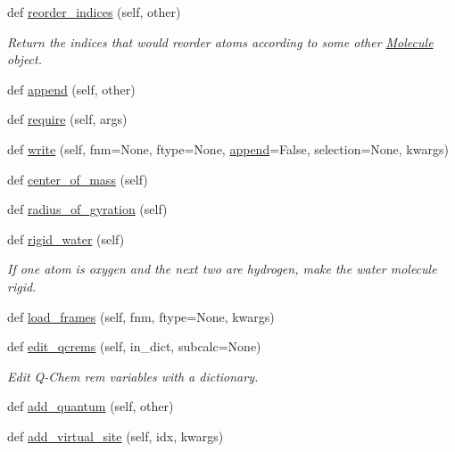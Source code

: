 \begin{DoxyCompactItemize}
def \hyperlink{classsrc_1_1molecule_1_1Molecule_a9f764980b8a0df810aa7264036617975}{reorder\+\_\+indices} (self, other)
\begin{DoxyCompactList}\small\item\em Return the indices that would reorder atoms according to some other \hyperlink{classsrc_1_1molecule_1_1Molecule}{Molecule} object. \end{DoxyCompactList}\item 
def \hyperlink{classsrc_1_1molecule_1_1Molecule_a1969b621b7e6e65722ec245b74518cfe}{append} (self, other)
\item 
def \hyperlink{classsrc_1_1molecule_1_1Molecule_a5e74901959a8b939fc5a6c851e64d4ae}{require} (self, args)
\item 
def \hyperlink{classsrc_1_1molecule_1_1Molecule_a557af72409188133ef446ee8dbed2338}{write} (self, fnm=None, ftype=None, \hyperlink{classsrc_1_1molecule_1_1Molecule_a1969b621b7e6e65722ec245b74518cfe}{append}=False, selection=None, kwargs)
\item 
def \hyperlink{classsrc_1_1molecule_1_1Molecule_abd4e9ae70858f3f3d522ae6149236697}{center\+\_\+of\+\_\+mass} (self)
\item 
def \hyperlink{classsrc_1_1molecule_1_1Molecule_a972ec8931555662db70e0f6acaa009ca}{radius\+\_\+of\+\_\+gyration} (self)
\item 
def \hyperlink{classsrc_1_1molecule_1_1Molecule_a6b6551ae13458225d8fc8d117112e23f}{rigid\+\_\+water} (self)
\begin{DoxyCompactList}\small\item\em If one atom is oxygen and the next two are hydrogen, make the water molecule rigid. \end{DoxyCompactList}\item 
def \hyperlink{classsrc_1_1molecule_1_1Molecule_a93e42cc0135d2a68354e384d6bc9185b}{load\+\_\+frames} (self, fnm, ftype=None, kwargs)
\item 
def \hyperlink{classsrc_1_1molecule_1_1Molecule_ad47b76d0fe660f2cfafceb67f358a5c2}{edit\+\_\+qcrems} (self, in\+\_\+dict, subcalc=None)
\begin{DoxyCompactList}\small\item\em Edit Q-\/\+Chem rem variables with a dictionary. \end{DoxyCompactList}\item 
def \hyperlink{classsrc_1_1molecule_1_1Molecule_ab863d592cf9369137d6298eb005556c9}{add\+\_\+quantum} (self, other)
\item 
def \hyperlink{classsrc_1_1molecule_1_1Molecule_afa69c71616ba48c2641d3e2b5914b6d9}{add\+\_\+virtual\+\_\+site} (self, idx, kwargs)

\end{DoxyCompactItemize}
